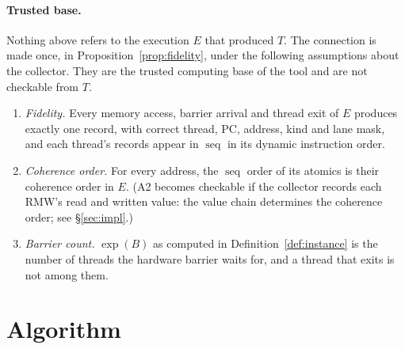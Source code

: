 \documentclass[11pt]{article}
\theoremstyle{remark}
\DeclareMathOperator{\seq}{seq}
\begin{document}
\paragraph{Trusted base.}
Nothing above refers to the execution $E$ that produced $T$. The connection is
made once, in Proposition~\ref{prop:fidelity}, under the following assumptions
about the collector. They are the trusted computing base of the tool and are
not checkable from $T$.
\begin{enumerate}
\item[(A1)] \emph{Fidelity.} Every memory access, barrier arrival and thread
      exit of $E$ produces exactly one record, with correct thread, PC,
      address, kind and lane mask, and each thread's records appear in $\seq$
      in its dynamic instruction order.
\item[(A2)] \emph{Coherence order.} For every address, the $\seq$ order of its
      atomics is their coherence order in $E$. (A2 becomes checkable if the
      collector records each RMW's read and written value: the value chain
      determines the coherence order; see \S\ref{sec:impl}.)
\item[(A3)] \emph{Barrier count.} $\exp(B)$ as computed in
      Definition~\ref{def:instance} is the number of threads the hardware
      barrier waits for, and a thread that exits is not among them.
\end{enumerate}

\section{Algorithm}\label{sec:alg}

\newcommand{\clk}{\mathit{clock}}
\newcommand{\lastR}{\mathit{lastRelease}}
\newcommand{\lastW}{\mathit{lastWrite}}
\newcommand{\rdrs}{\mathit{readers}}
\newcommand{\arrv}{\mathit{arrived}}
\end{document}
